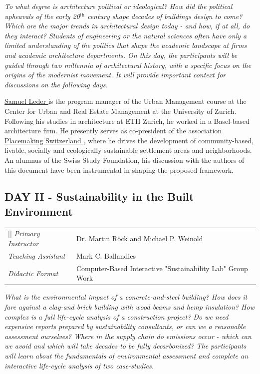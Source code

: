 \documentclass{article}
\begin{document}
\textit{To what degree is architecture political or ideological? How did the political upheavals of the early 20$^{\text{th}}$ century shape decades of buildings design to come? Which are the major trends in architectural design today - and how, if at all, do they interact? Students of engineering or the natural sciences often have only a limited understanding of the politics that shape the academic landscape at firms and academic architecture departments. On this day, the participants will be guided through two millennia of architectural history, with a specific focus on the origins of the modernist movement. It will provide important context for discussions on the following days.}

\href{https://www.linkedin.com/in/samuel-leder/}{Samuel Leder \ExternalLink} is the program manager of the Urban Management course at the Center for Urban and Real Estate Management at the University of Zurich. Following his studies in architecture at ETH Zurich, he worked in a Basel-based architecture firm. He presently serves as co-president of the association \href{https://www.placemaking-switzerland.ch}{Placemaking Switzerland \ExternalLink}, where he drives the development of  community-based, livable, socially and ecologically sustainable settlement areas and neighborhoods. An alumnus of the Swiss Study Foundation, his discussion with the authors of this document have been instrumental in shaping the proposed framework.

\subsection{DAY II - Sustainability in the Built Environment}

\begin{NiceTabular}{W{l}{3cm}l}[]
\textit{Primary Instructor} & Dr. Martin Röck and Michael P. Weinold \\
\textit{Teaching Assistant} & Mark C. Ballandies \\
\textit{Didactic Format} & Computer-Based Interactive "Sustainability Lab" Group Work
\end{NiceTabular}

\textit{What is the environmental impact of a concrete-and-steel building? How does it fare against a clay-and brick building with wood beams and hemp insulation? How complex is a full life-cycle analysis of a construction project? Do we need expensive reports prepared by sustainability consultants, or can we a reasonable assessment ourselves? Where in the supply chain do emissions occur - which can we avoid and which will take decades to be fully decarbonized? The participants will learn about the fundamentals of environmental assessment and complete an interactive life-cycle analysis of two case-studies.}
\end{document}

